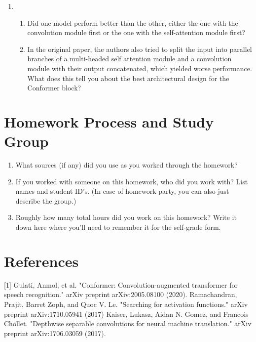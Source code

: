 \documentclass{article}
\begin{document}
\begin{enumerate}[label=(\alph*)]
\begin{enumerate}[label=(\roman*)]
    
\end{enumerate}
\item\mbox{}\\
\begin{enumerate}[label=(\roman*)]
    \item Did one model perform better than the other, either the one with the convolution module first or the one with the self-attention module first?

    \item In the original paper, the authors also tried to split the input into parallel branches of a multi-headed self attention module and a convolution module with their output concatenated, which yielded worse performance. What does this tell you about the best architectural design for the Conformer block?

\end{enumerate}
\end{enumerate}

\newpage
\thispagestyle{plain}
\section{Homework Process and Study Group}
\begin{enumerate}[label=(\alph*)]
    \item What sources (if any) did you use as you worked through the homework?
    \item If you worked with someone on this homework, who did you work with?
        List names and student ID’s. (In case of homework party, you can also just describe the group.)
    \item Roughly how many total hours did you work on this homework? Write it down here where you’ll need to remember it for the self-grade form.

\end{enumerate}

\newpage
\thispagestyle{plain}
\section{References}
[1] Gulati, Anmol, et al. "Conformer: Convolution-augmented transformer for speech recognition." arXiv preprint arXiv:2005.08100 (2020). 
\newline\newline
[2] Ramachandran, Prajit, Barret Zoph, and Quoc V. Le. "Searching for activation functions." arXiv preprint arXiv:1710.05941 (2017)
\newline\newline
[3] Kaiser, Lukasz, Aidan N. Gomez, and Francois Chollet. "Depthwise separable convolutions for neural machine translation." arXiv preprint arXiv:1706.03059 (2017).
\end{document}
